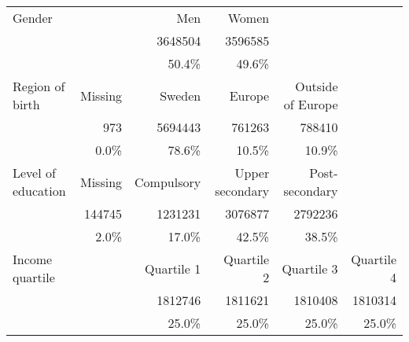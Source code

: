 \begin{tabular}{@{}l*{5}{r}@{}}
\toprule
Gender             &              & {Men}         & {Women}           &                     & \tabularnewline
                   &              & \num{3648504} & \num{3596585}     &                     & \tabularnewline
                   &              & 50.4\%        & 49.6\%            &                     & \tabularnewline
\midrule
Region of birth    & {Missing}    & {Sweden}      & {Europe}          & {Outside of Europe} & \tabularnewline
                   & \num{973}    & \num{5694443} & \num{761263}      & \num{788410}        & \tabularnewline
                   & 0.0\%        & 78.6\%        & 10.5\%            & 10.9\%              & \tabularnewline
\midrule
Level of education & {Missing}    & {Compulsory}  & {Upper secondary} & {Post-secondary}    & \tabularnewline
                   & \num{144745} & \num{1231231} & \num{3076877}     & \num{2792236}       & \tabularnewline
                   & 2.0\%        & 17.0\%        & 42.5\%            & 38.5\%              & \tabularnewline
\midrule
Income quartile    &              & {Quartile 1}  & {Quartile 2}      & {Quartile 3}        & {Quartile 4}  \tabularnewline
                   &              & \num{1812746} & \num{1811621}     & \num{1810408}       & \num{1810314} \tabularnewline
                   &              & 25.0\%        & 25.0\%            & 25.0\%              & 25.0\%        \tabularnewline
\bottomrule
\end{tabular}